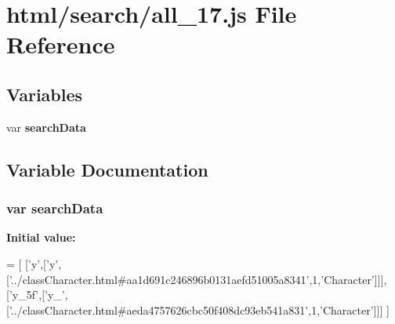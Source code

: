 \section{html/search/all\-\_\-17.js File Reference}
\label{all__17_8js}
\subsection*{Variables}
\begin{DoxyCompactItemize}
\item 
var {\bf search\-Data}
\end{DoxyCompactItemize}


\subsection{Variable Documentation}
\subsubsection[{search\-Data}]{\setlength{\rightskip}{0pt plus 5cm}var search\-Data}\label{all__17_8js_ad01a7523f103d6242ef9b0451861231e}
{\bfseries Initial value\-:}
\begin{DoxyCode}
=
[
  [\textcolor{charliteral}{'y'},[\textcolor{charliteral}{'y'},[\textcolor{stringliteral}{'../classCharacter.html#aa1d691c246896b0131aefd51005a8341'},1,\textcolor{stringliteral}{'Character'}]]],
  [\textcolor{stringliteral}{'y\_5f'},[\textcolor{stringliteral}{'y\_'},[\textcolor{stringliteral}{'../classCharacter.html#aeda4757626cbc50f408dc93eb541a831'},1,\textcolor{stringliteral}{'Character'}]]]
]
\end{DoxyCode}
